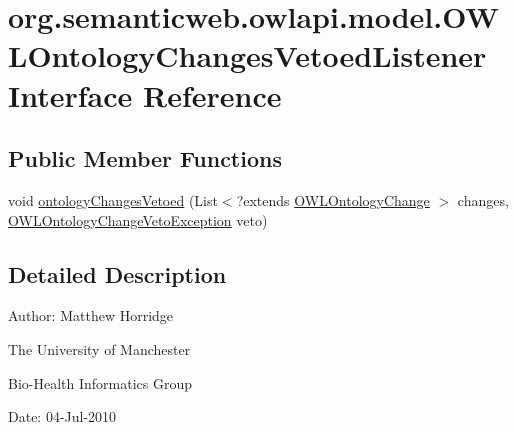 \hypertarget{interfaceorg_1_1semanticweb_1_1owlapi_1_1model_1_1_o_w_l_ontology_changes_vetoed_listener}{\section{org.\-semanticweb.\-owlapi.\-model.\-O\-W\-L\-Ontology\-Changes\-Vetoed\-Listener Interface Reference}
\label{interfaceorg_1_1semanticweb_1_1owlapi_1_1model_1_1_o_w_l_ontology_changes_vetoed_listener}
}
\subsection*{Public Member Functions}
\begin{DoxyCompactItemize}
\item 
void \hyperlink{interfaceorg_1_1semanticweb_1_1owlapi_1_1model_1_1_o_w_l_ontology_changes_vetoed_listener_a24efa2be3c7c977f3cf642b496911281}{ontology\-Changes\-Vetoed} (List$<$?extends \hyperlink{classorg_1_1semanticweb_1_1owlapi_1_1model_1_1_o_w_l_ontology_change}{O\-W\-L\-Ontology\-Change} $>$ changes, \hyperlink{classorg_1_1semanticweb_1_1owlapi_1_1model_1_1_o_w_l_ontology_change_veto_exception}{O\-W\-L\-Ontology\-Change\-Veto\-Exception} veto)
\end{DoxyCompactItemize}


\subsection{Detailed Description}
Author\-: Matthew Horridge\par
 The University of Manchester\par
 Bio-\/\-Health Informatics Group\par
 Date\-: 04-\/\-Jul-\/2010 

